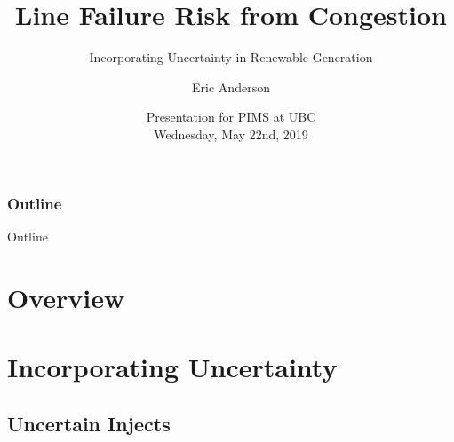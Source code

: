 
\newcommand{\mypathbase}{/home/eric/work/present/ases-present}
\newcommand{\mypathdata}{\mypathbase/data}
\newcommand{\mypathjcc}{\mypathbase/jcc}
\newcommand{\mypathjccdata}{\mypathbase/jcc/data}
\newcommand{\mypathdfo}{\mypathbase/dfo}
\newcommand{\mypathimg}{\mypathbase/img}
\newcommand{\bc}[1]{}

\title[Reliability and Renewable Generation]{Line Failure Risk from Congestion}
\subtitle{Incorporating Uncertainty in Renewable Generation}
\author{Eric Anderson}

\date{Presentation for PIMS at UBC \\
  Wednesday, May 22nd, 2019}


\begin{frame}
\titlepage
\end{frame}





\subsubsection{Outline}
\begin{frame}{Outline}

\tableofcontents[subsubsectionstyle=hide]  

\end{frame}

\section{Overview}



\section{Incorporating Uncertainty}
\frame{\tableofcontents[currentsection,subsubsectionstyle=hide]}

\subsection{Uncertain Injects}
\bc{\begin{frame}{Uncertain Injects}
\alert{Uncertainty in Injects to Power System}
\bi
\item Subset of nodes have uncertain injections
\bi
\item Solar, wind
\item Demand (relatively certain, however EVs could represent change)
\ei
\pause
\item Subset of assets respond to uncertainty (slack distribution)
\bi
\item Rotational inertia, peaker plants and regulation
\item Energy storage, enhanced power controls
\ei
\ei
\end{frame}
}

